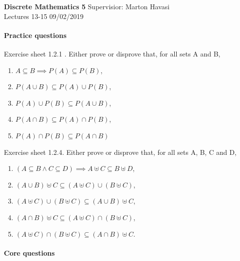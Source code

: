 \documentclass{exam}
\begin{document}
\noindent
\large\textbf{Discrete Mathematics 5} \hfill Supervisior: Marton Havasi \\
\normalsize Lectures 13-15 \hfill 09/02/2019

\paragraph{Practice questions}
\begin{questions}

\question Exercise sheet 1.2.1 . Either prove or disprove that, for all sets A and B,
\begin{enumerate}[label=(\alph*)]
\item $A \subseteq B \implies P(A) \subseteq P(B)$,
\item $P(A \cup B) \subseteq P(A) \cup P(B)$,
\item $P(A) \cup P(B) \subseteq P(A \cup B)$,
\item $P(A \cap B) \subseteq P(A) \cap P(B)$,
\item $P(A) \cap P(B) \subseteq P(A \cap B)$
\end{enumerate} 

\question Exercise sheet 1.2.4. Either prove or disprove that, for all sets A, B, C and D,
\begin{enumerate}[label=(\alph*)]
\item $(A \subseteq B \wedge C \subseteq D) \implies A \uplus C \subseteq B \uplus D$,
\item $(A \cup B) \uplus C \subseteq (A \uplus C) \cup (B \uplus C)$,
\item $(A \uplus C) \cup (B \uplus C) \subseteq (A \cup B) \uplus C$,
\item $(A \cap B) \uplus C \subseteq (A \uplus C) \cap (B \uplus C)$,
\item $(A \uplus C) \cap (B \uplus C) \subseteq (A \cap B) \uplus C$.
\end{enumerate}
\end{questions}

\paragraph{Core questions}
\end{document}
